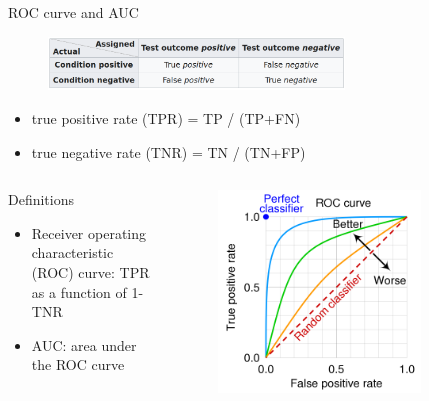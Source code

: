 \documentclass[xcolor=pdftex,dvipsnames,table,mathserif]{beamer}
\begin{document}
\begin{frame}{ROC curve and AUC }

  \begin{figure}[ht]
    \centering
    \includegraphics[width=0.7\textwidth]{contingency_table}
  \end{figure}

  \begin{itemize}
  \item true positive rate (TPR) = TP / (TP+FN)
  \item true negative rate (TNR) = TN / (TN+FP)
  \end{itemize}

\begin{columns}
  \begin{column}{.5\textwidth}
  \begin{block}{Definitions}
  \begin{itemize}
  \item Receiver operating characteristic (ROC) curve: TPR as a function of 1-TNR
  \item AUC: area under the ROC curve
  \end{itemize}
\end{block}

  \end{column}

  \begin{column}{.5\textwidth}
\begin{figure}[ht]
  \centering
  \includegraphics[width=0.8\textwidth]{roc_curve}
\end{figure}

  \end{column}
\end{columns}




\end{frame}
\end{document}
